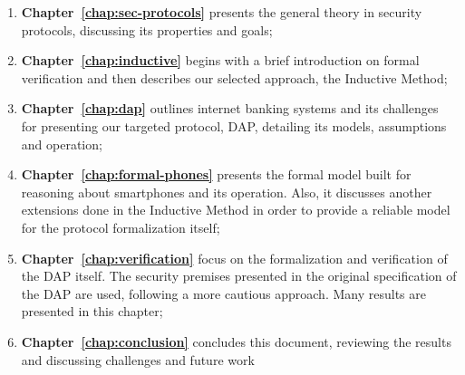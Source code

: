\begin{enumerate}
    \item \textbf{Chapter~\ref{chap:sec-protocols}} presents the general theory in security protocols, discussing its properties and goals;

    \item \textbf{Chapter~\ref{chap:inductive}} begins with a brief introduction on formal verification and then describes our selected approach, the Inductive Method;

    \item \textbf{Chapter~\ref{chap:dap}} outlines internet banking systems and its challenges for presenting our targeted protocol, DAP, detailing its models, assumptions and operation;
    
    \item \textbf{Chapter~\ref{chap:formal-phones}} presents the formal model built for reasoning about smartphones and its operation. Also, it discusses another extensions done in the Inductive Method in order to provide a reliable model for the protocol formalization itself;

    \item \textbf{Chapter~\ref{chap:verification}} focus on the formalization and verification of the DAP itself. The security premises presented in the original specification of the DAP are used, following a more cautious approach. Many results are presented in this chapter; 
    
    \item \textbf{Chapter~\ref{chap:conclusion}} concludes this document, reviewing the results and discussing challenges and future work
\end{enumerate}
